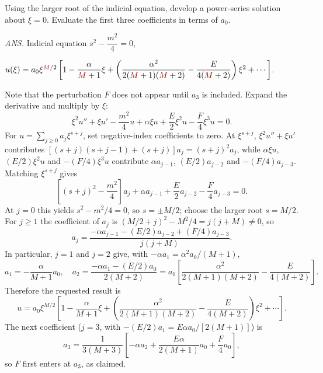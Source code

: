 Using the larger root of the indicial equation, develop a power-series
solution about $\xi=0$. Evaluate the first three coefficients in terms of
$a_{0}$.
\par\nobreak\hfill\emph{ANS.}\enspace
Indicial equation $s^{2}-\dfrac{m^{2}}{4}=0$,\par
\nobreak\hfill
{}
$u(\xi)=a_{0}\xi^{\erratum{M}/2}\left[1-\dfrac{\alpha}{\erratum{M}+1}\xi
+\left(\dfrac{\alpha^{2}}{2(\erratum{M}+1)(\erratum{M}+2)}
-\dfrac{E}{4(\erratum{M}+2)}\right)\xi^{2}+\cdots\right]$.\par
Note that the perturbation $F$ does not appear until $a_{3}$ is included.
\solution
{}
Expand the derivative and multiply by $\xi$:
\[
\xi^2u''+\xi u'-\frac{m^2}{4}u
 +\alpha\xi u+\frac E2\xi^2u-\frac F4\xi^3u=0.
\]
For $u=\sum_{j\ge0}a_j\xi^{s+j}$, set negative-index coefficients to
zero. At $\xi^{s+j}$, $\xi^2u''+\xi u'$ contributes
$[(s+j)(s+j-1)+(s+j)]a_j=(s+j)^2a_j$, while $\alpha\xi u$,
$(E/2)\xi^2u$ and $-(F/4)\xi^3u$ contribute $\alpha a_{j-1}$,
$(E/2)a_{j-2}$ and $-(F/4)a_{j-3}$. Matching $\xi^{s+j}$ gives
\[
\left[(s+j)^2-\frac{m^2}{4}\right]a_j
 +\alpha a_{j-1}+\frac E2a_{j-2}-\frac F4a_{j-3}=0.
\]
At $j=0$ this yields $s^2-m^2/4=0$, so $s=\pm M/2$; choose the larger
root $s=M/2$. For $j\ge1$ the coefficient of $a_j$ is
$(M/2+j)^2-M^2/4=j(j+M)\ne0$, so
\[
a_j=\frac{-\alpha a_{j-1}-(E/2)a_{j-2}+(F/4)a_{j-3}}{j(j+M)}.
\]
In particular, $j=1$ and $j=2$ give, with $-\alpha a_1=\alpha^2a_0/(M+1)$,
\[
a_1=-\frac\alpha{M+1}a_0,
\quad
a_2=\frac{-\alpha a_1-(E/2)a_0}{2(M+2)}
=a_0\left[\frac{\alpha^2}{2(M+1)(M+2)}-\frac E{4(M+2)}\right].
\]
Therefore the requested result is
\[
\boxed{u=a_0\xi^{M/2}\left[1-\frac\alpha{M+1}\xi
 +\left(\frac{\alpha^2}{2(M+1)(M+2)}-\frac E{4(M+2)}\right)\xi^2
 +\cdots\right]}.
\]
The next coefficient ($j=3$, with $-(E/2)a_1=E\alpha a_0/[2(M+1)]$) is
\[
a_3=\frac1{3(M+3)}\left[-\alpha a_2
 +\frac{E\alpha}{2(M+1)}a_0+\frac F4a_0\right],
\]
so $F$ first enters at $a_3$, as claimed.

